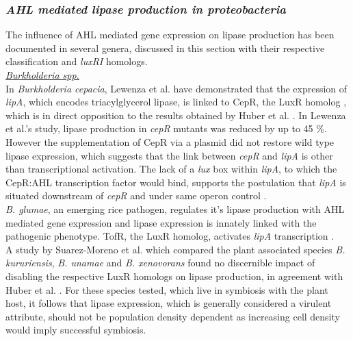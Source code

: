 \documentclass[twoside]{article}
\begin{document}
\subsubsection{\emph{AHL mediated lipase production in proteobacteria}}
The influence of AHL mediated gene expression on lipase production has been documented in several genera, discussed in this section with their respective classification and \emph{luxRI} homologs.\\


\emph{\underline{Burkholderia spp.}} 
\\In \emph{Burkholderia cepacia}, Lewenza et al. have demonstrated that the expression of \emph{lipA}, which encodes triacylglycerol lipase, is linked to CepR, the LuxR homolog \cite{lewenza1999}, which is in direct opposition to the results obtained by Huber et al. \cite{huber2001}. In Lewenza et al.'s study, lipase production in \emph{cepR} mutants was reduced by up to 45 \%. However the supplementation of CepR via a plasmid did not restore wild type lipase expression, which suggests that the link between \emph{cepR} and \emph{lipA} is other than transcriptional activation. The lack of a \emph{lux} box within \emph{lipA}, to which the CepR:AHL transcription factor would bind, supports the postulation that \emph{lipA} is situated downstream of \emph{cepR} and under same operon control \cite{lewenza1999}.\\



\emph{B. glumae}, an emerging rice pathogen, regulates it's lipase production with AHL mediated gene expression and lipase expression is innately linked with the pathogenic phenotype. TofR, the LuxR homolog, activates \emph{lipA} transcription \cite{devescovi_07}. \\


A study by Suarez-Moreno et al. which compared the plant associated species \emph{B. kururiensis}, \emph{B. unamae} and \emph{B. xenovorans} found no discernible impact of disabling the respective LuxR homologs on lipase production, in agreement with Huber et al. \cite{huber2001,suarez2010}. For these species tested, which live in symbiosis with the plant host, it follows that lipase expression, which is generally considered a virulent attribute, should not be population density dependent as increasing cell density would imply successful symbiosis. \\
\end{document}
